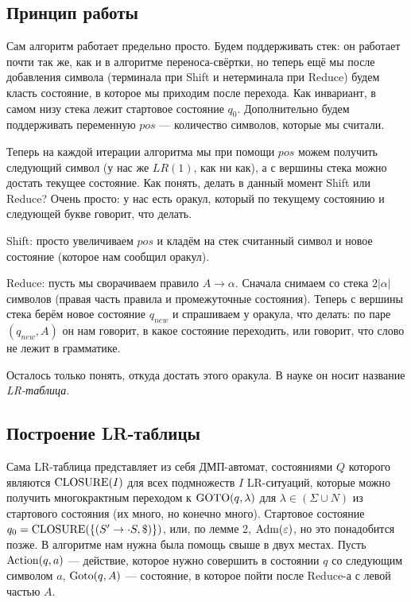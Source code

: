 \QED

\subsection{Принцип работы} 
Сам алгоритм работает предельно просто.
Будем поддерживать стек: он работает почти так же, как и в алгоритме переноса-свёртки, но теперь ещё мы после добавления символа (терминала при Shift и нетерминала при Reduce) будем класть состояние, в которое мы приходим после перехода.
Как инвариант, в самом низу стека лежит стартовое состояние $q_0$.
Дополнительно будем поддерживать переменную $pos$ --- количество символов, которые мы считали.

Теперь на каждой итерации алгоритма мы при помощи $pos$ можем получить следующий символ (у нас же $LR(1)$, как ни как), а с вершины стека можно достать текущее состояние.
Как понять, делать в данный момент Shift или Reduce? Очень просто: у нас есть оракул, который по текущему состоянию и следующей букве говорит, что делать.

Shift: просто увеличиваем $pos$ и кладём на стек считанный символ и новое состояние (которое нам сообщил оракул).

Reduce: пусть мы сворачиваем правило $A \to \alpha$. Сначала снимаем со стека $2|\alpha|$ символов (правая часть правила и промежуточные состояния).
Теперь с вершины стека берём новое состояние $q_{new}$ и спрашиваем у оракула, что делать: по паре $(q_{new}, A)$ он нам говорит, в какое состояние переходить, или говорит, что слово не лежит в грамматике.

Осталось только понять, откуда достать этого оракула.
В науке он носит название \textit{LR-таблица}.

\subsection{Построение LR-таблицы}
Сама LR-таблица представляет из себя ДМП-автомат, состояниями $Q$ которого являются $\operatorname{CLOSURE}(I)$ для всех подмножеств $I$ LR-ситуаций, которые можно получить многокрактным переходом к $\operatorname{GOTO}(q, \lambda)$ для $\lambda \in (\Sigma \cup N)$ из стартового состояния (их много, но конечно много).
Стартовое состояние $q_0 = \operatorname{CLOSURE}(\{(S' \to \cdot S, \$)\})$, или, по лемме 2, $\operatorname{Adm}(\varepsilon)$, но это понадобится позже.
В алгоритме нам нужна была помощь свыше в двух местах.
Пусть $\operatorname{Action}(q, a)$ --- действие, которое нужно совершить в состоянии $q$ со следующим символом $a$, $\operatorname{Goto}(q, A)$ --- состояние, в которое пойти после Reduce-а с левой частью $A$.

